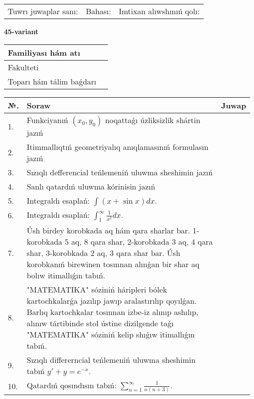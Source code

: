 \documentclass{article}
\begin{document}
\vspace{1cm}

\begin{tabular}{ c c c }
Tuwrı juwaplar sanı: \underline{\hspace{2cm}} & Bahası: \underline{\hspace{2cm}} & Imtixan alıwshınıń qolı: \underline{\hspace{2cm}} \\
\end{tabular}

\newpage

\begin{center}\textbf{45-variant}\end{center}

\bgroup
\def\arraystretch{1.5}
\begin{tabular}{ |m{6cm}|m{10cm}| }
  \hline
  Familiyası hám atı & \\
  \hline
  Fakulteti &\\
  \hline
  Toparı hám tálim baǵdarı & \\
  \hline
\end{tabular}
\egroup

\vspace{0.5cm}

\bgroup
\def\arraystretch{2}
\begin{tabular}{ |l|m{8cm}|m{7cm}| }
  \hline
  №. & Soraw & Juwap \\
  \hline
  1. & Funkciyanıń $(x_{0}, y_{0})$ noqattaǵı úzliksizlik shártin jazıń &  \\
  \hline
  2. & Itimmallıqtıń geometriyalıq anıqlamasınıń formulasın jazıń &  \\
  \hline
  3. & Sızıqlı defferencial teńlemeniń uluwma sheshimin jazıń &  \\
  \hline
  4. & Sanlı qatardıń uluwma kórinisin jazıń &  \\
  \hline
  5. & Integraldı esaplań: $\displaystyle\int (x + \sin x)dx$. &  \\
  \hline
  6. & Integraldı esaplań: $\displaystyle\int_{1}^{\infty}{\frac{1}{x^{2}}dx}$. &  \\
  \hline
  7. & Úsh birdey korobkada aq hám qara sharlar bar. 1-korobkada 5 aq, 8 qara shar, 2-korobkada 3 aq, 4 qara shar, 3-korobkada 2 aq, 3 qara shar bar. Úsh korobkanıń birewinen tosınnan alınǵan bir shar aq bolıw itimallıǵın tabıń. &  \\
  \hline
  8. & "MATEMATIKA" sóziniń háripleri bólek kartochkalarǵa jazılıp jawıp aralastırılıp qoyılǵan. Barlıq kartochkalar tosınnan izbe-iz alınıp ashılıp, alınıw tártibinde stol ústine dizilgende taǵı "MATEMATIKA" sóziniń kelip shıǵıw itimallıǵın tabıń. &  \\
  \hline
  9. & Sızıqlı differerncial teńlemeniń uluwma sheshimin tabıń $y' + y =e^{-x}$. &  \\
  \hline
  10. & Qatardıń qosındısın tabıń: $\displaystyle\sum_{n = 1}^{\infty}\frac{1}{n(n + 3)}$. &  \\
  \hline
\end{tabular}
\egroup
\end{document}
